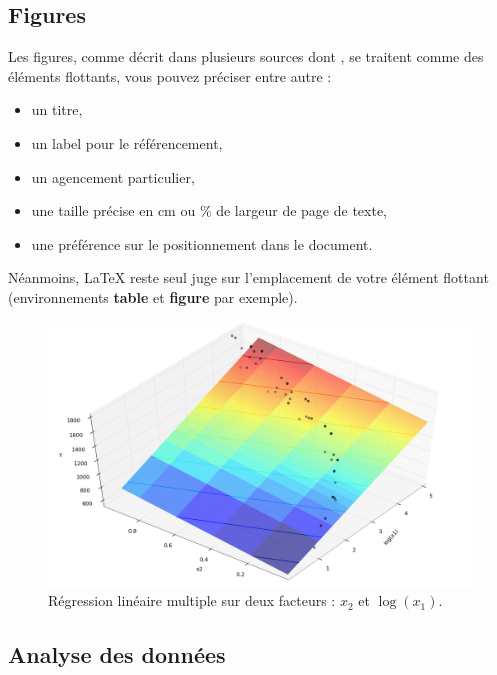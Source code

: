 \documentclass[12pt]{article} %
\begin{document}
\subsection{Figures}

Les figures, comme décrit dans plusieurs sources dont \cite{codecco2001endemic}, se traitent comme des éléments flottants, vous pouvez préciser entre autre :
\begin{itemize}
	\item un titre,
	\item un label pour le référencement,
	\item un agencement particulier,
	\item une taille précise en cm ou \% de largeur de page de texte,
	\item une préférence sur le positionnement dans le document.
\end{itemize}

Néanmoins, \LaTeX{} reste seul juge sur l'emplacement de votre élément flottant (environnements \textbf{table} et \textbf{figure} par exemple).

\begin{figure}[ht] %
	\centering
	\includegraphics[width=\textwidth]{image.png}
	\caption{Régression linéaire multiple sur deux facteurs : $x_2$ et $\log(x_1)$.}
	\label{fig:image}
\end{figure}

\subsection{Analyse des données}
\end{document}
